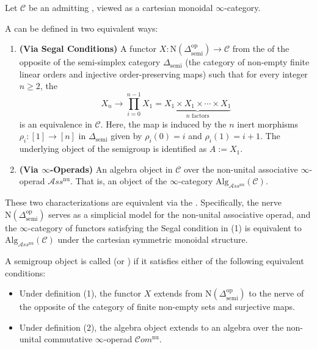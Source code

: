 \begin{definition} \label{definition:semigroup_object_in_an_infty_category}
    Let $\mathcal{C}$ be an  admitting , viewed as a cartesian monoidal $\infty$-category.

    A  can be defined in two equivalent ways:
    
    \begin{enumerate}
        \item \textbf{(Via Segal Conditions)} A functor $X : \mathrm{N}(\Delta_{\mathrm{semi}}^{\mathrm{op}}) \to \mathcal{C}$ from the  of the opposite of the semi-simplex category $\Delta_{\mathrm{semi}}$ (the category of non-empty finite linear orders and injective order-preserving maps) such that for every integer $n \ge 2$, the 
        $$X_n \to \prod_{i=0}^{n-1} X_1 = \underbrace{X_1 \times X_1 \times \cdots \times X_1}_{n \text{ factors}}$$
        is an equivalence in $\mathcal{C}$. Here, the map is induced by the $n$ inert morphisms $\rho_i : [1] \to [n]$ in $\Delta_{\mathrm{semi}}$ given by $\rho_i(0) = i$ and $\rho_i(1) = i+1$. The underlying object of the semigroup is identified as $A := X_1$.

        \item \textbf{(Via $\infty$-Operads)} An algebra object in $\mathcal{C}$ over the non-unital associative $\infty$-operad $\mathcal{A}ss^{\mathrm{nu}}$. That is, an object of the $\infty$-category $\mathrm{Alg}_{\mathcal{A}ss^{\mathrm{nu}}}(\mathcal{C})$.
    \end{enumerate}

    These two characterizations are equivalent via the . Specifically, the nerve $\mathrm{N}(\Delta_{\mathrm{semi}}^{\mathrm{op}})$ serves as a simplicial model for the non-unital associative operad, and the $\infty$-category of functors satisfying the Segal condition in (1) is equivalent to $\mathrm{Alg}_{\mathcal{A}ss^{\mathrm{nu}}}(\mathcal{C})$ under the cartesian symmetric monoidal structure.

    A semigroup object is called  (or ) if it satisfies either of the following equivalent conditions:
    \begin{itemize}
        \item Under definition (1), the functor $X$ extends from $\mathrm{N}(\Delta_{\mathrm{semi}}^{\mathrm{op}})$ to the nerve of the opposite of the category of finite non-empty sets and surjective maps.
        \item Under definition (2), the algebra object extends to an algebra over the non-unital commutative $\infty$-operad $\mathcal{C}om^{\mathrm{nu}}$.
    \end{itemize}
\end{definition}


